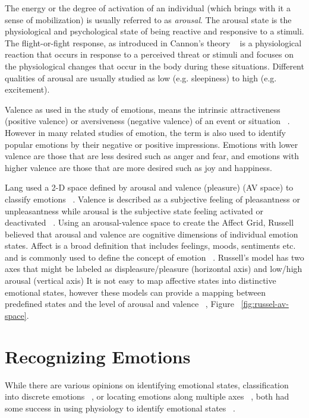The energy or the degree of activation of an individual (which brings with it a sense of mobilization) is usually referred to as \textit{arousal}. The arousal state is the physiological and psychological state of being reactive and responsive to a stimuli. The flight-or-fight response, as introduced in Cannon's theory ~\cite{stern2001psychophysiological} is a physiological reaction that occurs in response to a perceived threat or stimuli and focuses on the physiological changes that occur in the body during these situations. Different qualities of arousal are usually studied as low (e.g. sleepiness) to high (e.g. excitement).

Valence as used in the study of emotions, means the intrinsic attractiveness (positive valence) or aversiveness (negative valence) of an event or situation ~\cite{frijda1986emotions}. However in many related studies of emotion, the term is also used to identify popular emotions by their negative or positive impressions. Emotions with lower valence are those that are less desired such as anger and fear, and emotions with higher valence are those that are more desired such as joy and happiness.

Lang used a 2-D space defined by arousal and valence (pleasure) (AV space) to classify emotions ~\cite{lang1995emotion}. Valence is described as a subjective feeling of pleasantness or unpleasantness while arousal is the subjective state feeling activated or deactivated ~\cite{barrett1998discrete}. Using an arousal-valence space to create the Affect Grid, Russell believed that arousal and valence are cognitive dimensions of individual emotion states. Affect is a broad definition that includes feelings, moods, sentiments etc. and is commonly used to define the concept of emotion ~\cite{picard2003affective}. Russell's model has two axes that might be labeled as displeasure/pleasure (horizontal axis) and low/high arousal (vertical axis) It is not easy to map affective states into distinctive emotional states, however these models can provide a mapping between predefined states and the level of arousal and valence ~\cite{zagalo2004story}, Figure ~\ref{fig:russel-av-space}.

\section{Recognizing Emotions}

While there are various opinions on identifying emotional states, classification into discrete emotions ~\cite{dalgleish1999handbook}, or locating emotions along multiple axes ~\cite{russell1989affect, lang1995emotion}, both had some success in using physiology to identify emotional states ~\cite{cacioppo2000psychophysiology}.

